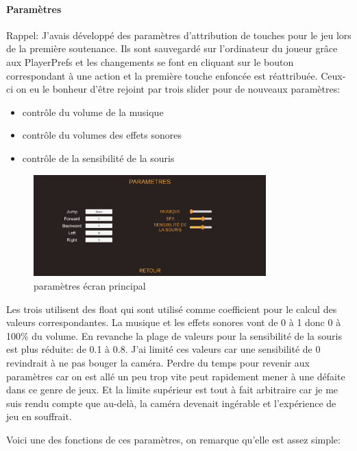 \documentclass{article}
\begin{document}
\paragraph{Paramètres}
Rappel: J'avais développé des paramètres d'attribution de touches pour le jeu lors de la première soutenance. Ils sont sauvegardé sur l'ordinateur du joueur grâce aux PlayerPrefs et les changements se font en cliquant sur le bouton correspondant à une action et la première touche enfoncée est réattribuée.
Ceux-ci on eu le bonheur d'être rejoint par trois slider pour de nouveaux paramètres:

\begin{itemize}
    \item contrôle du volume de la musique
    \item contrôle du volumes des effets sonores
    \item contrôle de la sensibilité de la souris
\end{itemize}

\begin{figure}[!h]
    \centering
    \includegraphics[width=0.8\textwidth]{parametres.png}
    \caption{paramètres écran principal}
\end{figure}

Les trois utilisent des float qui sont utilisé comme coefficient pour le calcul des valeurs correspondantes. La musique et les effets sonores vont de 0 à 1 donc 0 à 100\% du volume. En revanche la plage de valeurs pour la sensibilité de la souris est plus réduite: de 0.1 à 0.8. J'ai limité ces valeurs car une sensibilité de 0 revindrait à ne pas bouger la caméra. Perdre du temps pour revenir aux paramètres car on est allé un peu trop vite peut rapidement mener à une défaite dans ce genre de jeux. Et la limite supérieur est tout à fait arbitraire car je me suis rendu compte que au-delà, la caméra devenait ingérable et l'expérience de jeu en souffrait.

\newpage

Voici une des fonctions de ces paramètres, on remarque qu'elle est assez simple:
\end{document}

